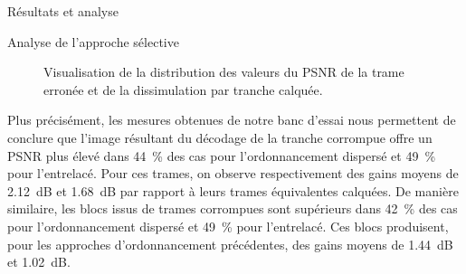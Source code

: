 \begin{chapter}{Résultats et analyse}
\begin{section}{Analyse de l'approche sélective}
\begin{figure}
\caption[PSNR de la trame erronée et de la dissimulation par tranche
calquée]{Visualisation de la distribution des valeurs du PSNR de la trame erronée et de la dissimulation par tranche calquée.}
\label{fig-ScVsErroneous}
\vspace{2em}
\end{figure}

Plus précisément, les mesures obtenues de notre banc d'essai nous permettent de
conclure que l'image résultant du décodage de la tranche corrompue offre un
PSNR plus élevé dans 44~\% des cas pour l'ordonnancement dispersé et 49~\% pour
l'entrelacé. Pour ces trames, on observe respectivement des gains moyens de
2.12~dB et 1.68~dB par rapport à leurs trames équivalentes calquées. De manière
similaire, les blocs issus de trames corrompues sont supérieurs dans 42~\% des
cas pour l'ordonnancement dispersé et 49~\% pour l'entrelacé. Ces blocs
produisent, pour les approches d'ordonnancement précédentes, des gains moyens de
1.44~dB et 1.02~dB.


\end{section}
\end{chapter}
